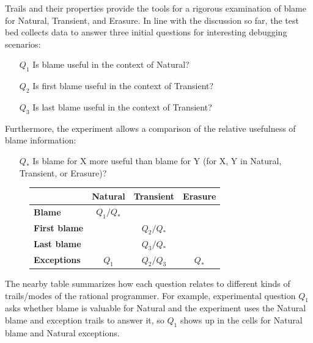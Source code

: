 
Trails and their properties provide the tools for a rigorous examination of
blame for Natural, Transient, and Erasure. In line with the discussion so far,
the test bed collects data to answer three initial questions for 
interesting debugging scenarios:
\begin{itemize}
\item[$Q_1$] Is blame useful in the context of Natural?

\item[$Q_2$] Is first blame useful in the context of Transient?

\item[$Q_3$] Is last blame useful in the context of Transient?

\end{itemize}

Furthermore, the experiment allows a comparison of the relative usefulness of blame
information:
\begin{itemize}
\item[$Q_*$] Is blame for X more useful than blame for Y (for X, Y in Natural, Transient, or Erasure)?
\end{itemize}

\begin{figure}
\footnotesize
\center
{\begin{tabular}{l|c|c|c}
                        & {\bf Natural}  & {\bf Transient} &  {\bf Erasure} \\ \hline 
{\bf Blame}             &  $Q_1/Q_*$    &                  &                \\
{\bf First blame}       &               &     $Q_2/Q_*$    &                 \\
{\bf Last blame}        &               &     $Q_3/Q_*$    &                 \\
{\bf Exceptions}        &      $Q_1$    &     $Q_2/Q_3$    &      $Q_*$      \\
\end{tabular}}
  \label{fig:experiment-outline}
\end{figure}

The nearby table summarizes how each question relates to
different kinds of trails/modes of the rational programmer. For example,
experimental question $Q_1$ asks whether blame is valuable for Natural and the
experiment uses the Natural blame and exception trails to answer it, so $Q_1$
shows up in the cells for Natural blame and Natural exceptions.

